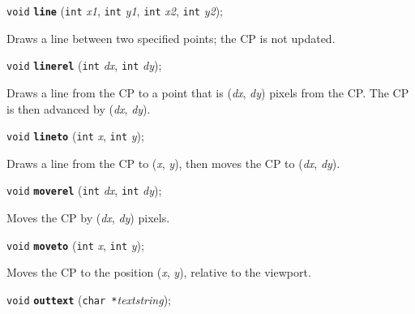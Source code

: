 \documentclass[a4paper,12pt]{article}
\newcommand{\V}{\texttt{void}}      %
\newcommand{\I}{\texttt{int}}       %
\newcommand{\C}{\texttt{char *}}    %
\newcommand{\func}[1]{\textbf{\texttt{#1}}}  %
\newcommand{\A}[1]{\emph{#1}}       %
\newenvironment{bgi}
{ %
  \begin{snugshade}
}
{ %
  \end{snugshade}
}
\begin{document}
\begin{bgi}
\V{} \func{line} (\I{} \A{x1}, \I{} \A{y1}, \I{} \A{x2}, \I{} \A{y2});
\end{bgi}

Draws a line between two specified points; the CP is not updated.


\label{sec:linerel}

\begin{bgi}
\V{} \func{linerel} (\I{} \A{dx}, \I{} \A{dy});
\end{bgi}

Draws a line from the CP to a point that is (\A{dx}, \A{dy}) pixels
from the CP. The CP is then advanced by (\A{dx}, \A{dy}).


\label{sec:lineto}

\begin{bgi}
\V{} \func{lineto} (\I{} \A{x}, \I{} \A{y});
\end{bgi}

Draws a line from the CP to (\A{x}, \A{y}), then moves the CP to
(\A{dx}, \A{dy}).


\label{sec:moverel}

\begin{bgi}
\V{} \func{moverel} (\I{} \A{dx}, \I{} \A{dy});
\end{bgi}

Moves the CP by (\A{dx}, \A{dy}) pixels.


\label{sec:moveto}

\begin{bgi}
\V{} \func{moveto} (\I{} \A{x}, \I{} \A{y});
\end{bgi}

Moves the CP to the position (\A{x}, \A{y}), relative to the
viewport.


\label{sec:outtext}

\begin{bgi}
\V{} \func{outtext} (\C{}\A{textstring});
\end{bgi}
\end{document}
